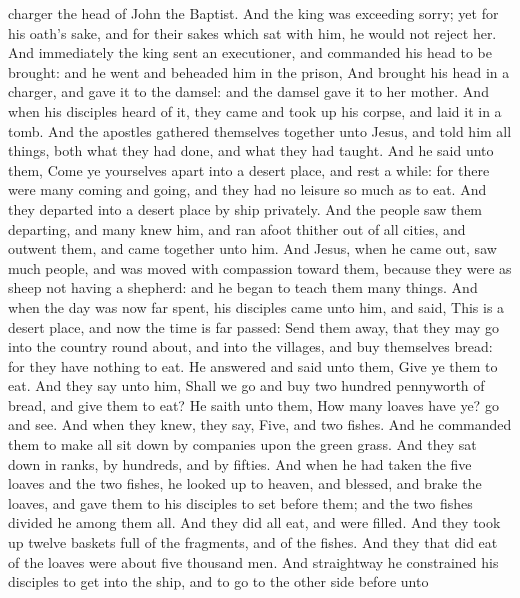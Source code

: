 charger the head of John the Baptist.  And the king was
exceeding sorry; yet for his oath's sake, and for their sakes which sat
with him, he would not reject her.  And immediately the
king sent an executioner, and commanded his head to be brought: and he
went and beheaded him in the prison,  And brought his
head in a charger, and gave it to the damsel: and the damsel gave it to
her mother.  And when his disciples heard of it, they
came and took up his corpse, and laid it in a tomb.  And
the apostles gathered themselves together unto Jesus, and told him all
things, both what they had done, and what they had taught.
 And he said unto them, Come ye yourselves apart into a
desert place, and rest a while: for there were many coming and going,
and they had no leisure so much as to eat.  And they
departed into a desert place by ship privately.  And the
people saw them departing, and many knew him, and ran afoot thither out
of all cities, and outwent them, and came together unto him.
 And Jesus, when he came out, saw much people, and was
moved with compassion toward them, because they were as sheep not having
a shepherd: and he began to teach them many things.  And
when the day was now far spent, his disciples came unto him, and said,
This is a desert place, and now the time is far passed: 
Send them away, that they may go into the country round about, and into
the villages, and buy themselves bread: for they have nothing to eat.
 He answered and said unto them, Give ye them to eat. And
they say unto him, Shall we go and buy two hundred pennyworth of bread,
and give them to eat?  He saith unto them, How many
loaves have ye? go and see. And when they knew, they say, Five, and two
fishes.  And he commanded them to make all sit down by
companies upon the green grass.  And they sat down in
ranks, by hundreds, and by fifties.  And when he had
taken the five loaves and the two fishes, he looked up to heaven, and
blessed, and brake the loaves, and gave them to his disciples to set
before them; and the two fishes divided he among them all.
 And they did all eat, and were filled. 
And they took up twelve baskets full of the fragments, and of the
fishes.  And they that did eat of the loaves were about
five thousand men.  And straightway he constrained his
disciples to get into the ship, and to go to the other side before unto
